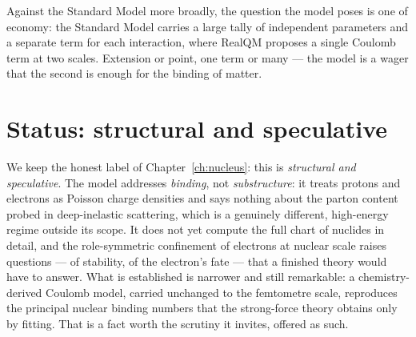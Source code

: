 Against the Standard Model more broadly, the question the model poses is one of economy: the Standard Model
carries a large tally of independent parameters and a separate term for each interaction, where RealQM proposes a
single Coulomb term at two scales. Extension or point, one term or many --- the model is a wager that the second
is enough for the binding of matter.

\section{Status: structural and speculative}\label{sec:nuc-binding-status}

We keep the honest label of Chapter~\ref{ch:nucleus}: this is \emph{structural and speculative}. The model
addresses \emph{binding}, not \emph{substructure}: it treats protons and electrons as Poisson charge densities
and says nothing about the parton content probed in deep-inelastic scattering, which is a genuinely different,
high-energy regime outside its scope. It does not yet compute the full chart of nuclides in detail, and the
role-symmetric confinement of electrons at nuclear scale raises questions --- of stability, of the electron's
fate --- that a finished theory would have to answer. What is established is narrower and still remarkable: a
chemistry-derived Coulomb model, carried unchanged to the femtometre scale, reproduces the principal nuclear
binding numbers that the strong-force theory obtains only by fitting. That is a fact worth the scrutiny it
invites, offered as such.
